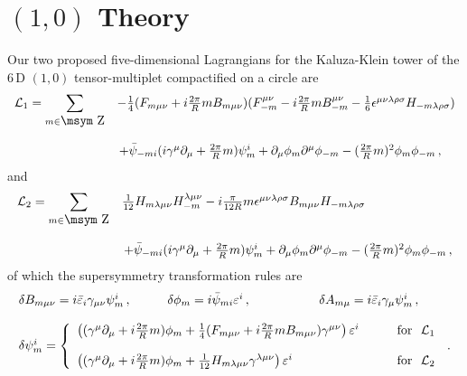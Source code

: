 \documentclass[a4paper,12pt]{article}
\def\Integer{{\mathop{\hbox{\msym \char  '132}}}}
\def\L{{\cal L}}
\def\pr{{\textstyle{\frac{2\pi}{R}}}}
\begin{document}
\section{$(1,0)$ Theory\label{sec10}}
Our two proposed five-dimensional Lagrangians for the Kaluza-Klein tower of the $6$\,D $(1,0)$ tensor-multiplet compactified on a circle are
\begin{equation}
\begin{array}{ll}
\L_{1}=\displaystyle{\sum_{m\in\Integer}}&-\textstyle{\frac{1}{4}}(F_{m\mu\nu}+i\pr mB_{m\mu\nu})(F_{-m}^{\mu\nu}-i\pr mB_{-m}^{\mu\nu}-\textstyle{\frac{1}{6}}\epsilon^{\mu\nu\lambda\rho\sigma}H_{-m\lambda\rho\sigma})\\
{}&{}\\
{}&\,+\bar{\psi}_{-mi}(i\gamma^{\mu}\partial_{\mu}+\pr m)\psi^{i}_{m}+\partial_{\mu}\phi_{m}\partial^{\mu}\phi_{-m}-(\pr m)^{2}\phi_{m}\phi_{-m}\,,
\end{array}
\end{equation}
and 
\begin{equation}
\begin{array}{ll}
\L_{2}=\displaystyle{\sum_{m\in\Integer}}&\textstyle{\frac{1}{12}}
H_{m\lambda\mu\nu}H_{-m}^{\lambda\mu\nu}-i\textstyle{\frac{\pi}{12R}}m
\epsilon^{\mu\nu\lambda\rho\sigma}B_{m\mu\nu}H_{-m\lambda\rho\sigma}\\
{}&{}\\
{}&\,+\bar{\psi}_{-mi}(i\gamma^{\mu}\partial_{\mu}+\pr m)\psi^{i}_{m}+\partial_{\mu}\phi_{m}\partial^{\mu}\phi_{-m}-(\pr m)^{2}\phi_{m}\phi_{-m}\,,
\end{array}
\end{equation}
of which  the   supersymmetry transformation rules are
\begin{equation}
\begin{array}{ccc}
\delta B_{m\mu\nu}=i\bar{\varepsilon}_{i}\gamma_{\mu\nu}\psi_{m}^{i}\,,~~~&~~~
\delta \phi_{m}=i\bar{\psi}_{mi}\varepsilon^{i}\,,~~~&~~~
\delta A_{m\mu}=i\bar{\varepsilon}_{i}\gamma_{\mu}\psi^{i}_{m}\,,\\
{}&{}&{}\\
\multicolumn{3}{c}{\delta\psi_{m}^{i}=\left\{\begin{array}{ll}
\left((\gamma^{\mu}\partial_{\mu}+i\pr m)\phi_{m}+\textstyle{\frac{1}{4}}
(F_{m\mu\nu}+i\pr mB_{m\mu\nu})\gamma^{\mu\nu}\right)\varepsilon^{i}~~~~&~~\mbox{for~~}\L_{1}\\
{}&{}\\
\left((\gamma^{\mu}\partial_{\mu}+i\pr m)\phi_{m}+\textstyle{\frac{1}{12}}
H_{m\lambda\mu\nu}\gamma^{\lambda\mu\nu}\right)\varepsilon^{i}~~~~&~~\mbox{for~~}\L_{2}
\end{array}\right. \,.}
\end{array}
\label{susy}
\end{equation}
\end{document}
